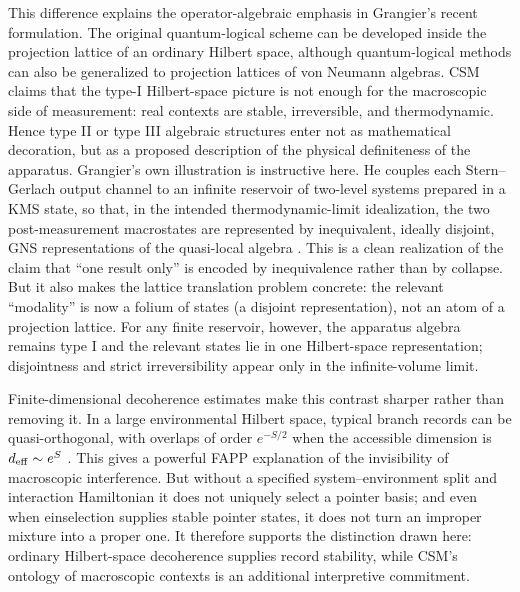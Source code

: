 \documentclass[
aps,
pra,
reprint,
superscriptaddress,
nofootinbib,
longbibliography
]{revtex4-2}
\begin{document}
This difference explains the operator-algebraic emphasis in Grangier's recent
formulation.  The original quantum-logical scheme can be developed inside the
projection lattice of an ordinary Hilbert space, although quantum-logical
methods can also be generalized to projection lattices of von Neumann
algebras.  CSM claims that the type-I Hilbert-space picture is not enough for
the macroscopic side of measurement: real contexts are stable, irreversible,
and thermodynamic.  Hence type II or type III algebraic structures enter not
as mathematical decoration, but as a proposed description of the physical
definiteness of the apparatus.  Grangier's own illustration is instructive
here.  He couples each Stern--Gerlach output channel to an infinite reservoir
of two-level systems prepared in a KMS state, so that, in the intended
thermodynamic-limit idealization, the two post-measurement macrostates are
represented by inequivalent, ideally disjoint, GNS representations of the
quasi-local algebra \cite{grangier2026}.  This is a clean realization of the
claim that ``one result only'' is encoded by inequivalence rather than by
collapse.  But it also makes the lattice translation problem concrete: the
relevant ``modality'' is now a folium of states (a disjoint representation),
not an atom of a projection lattice.  For any finite reservoir, however, the
apparatus algebra remains type I and the relevant states lie in one
Hilbert-space representation; disjointness and strict irreversibility appear
only in the infinite-volume limit.

Finite-dimensional decoherence estimates make this contrast sharper rather
than removing it.  In a large environmental Hilbert space, typical branch
records can be quasi-orthogonal, with overlaps of order $e^{-S/2}$ when the
accessible dimension is $d_{\rm eff}\sim e^S$ \cite{svozil2026ortho}.  This
gives a powerful FAPP explanation of the invisibility of macroscopic
interference.  But without a specified system--environment split and
interaction Hamiltonian it does not uniquely select a pointer basis; and even
when einselection supplies stable pointer states, it does not turn an improper
mixture into a proper one.  It therefore supports the distinction drawn here:
ordinary Hilbert-space decoherence supplies record stability, while CSM's
ontology of macroscopic contexts is an additional interpretive commitment.
\end{document}
